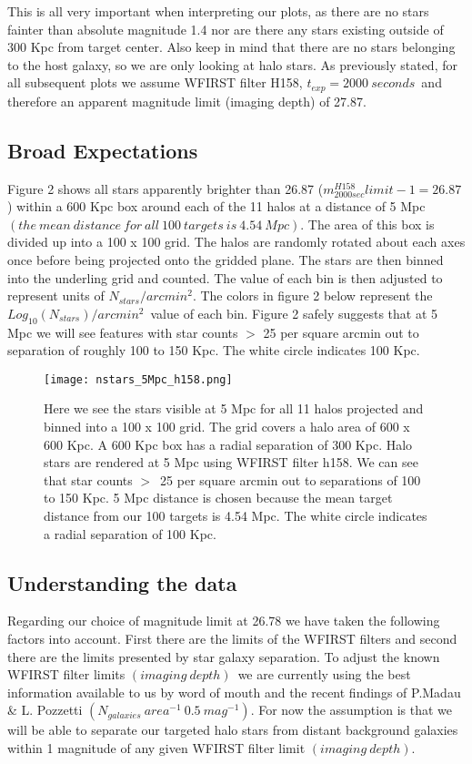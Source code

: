 \documentclass[11pt,a4paper,fleqn,notitlepage,oneside]{article}
\begin{document}
	This is all very important when interpreting our plots, as there are no stars fainter than absolute magnitude 1.4 nor are there any stars existing outside of 300 Kpc from target center.
	Also keep in mind that there are no stars belonging to the host galaxy, so we are only looking at halo stars.
	As previously stated, for all subsequent plots we assume WFIRST filter H158, $t_{exp}=2000\ seconds$\ and therefore an apparent magnitude limit (imaging depth) of 27.87.

	\subsection{Broad Expectations} %
		\label{sub:broad_expectations}
		Figure 2 shows all stars apparently brighter than 26.87 ($m^{H158}_{2000sec}limit-1=26.87$) within a 600 Kpc box around each of the 11 halos at a distance of 5 Mpc $(the \ mean\ distance\ for\ all\ 100\ targets\ is\ 4.54\ Mpc)$.
		The area of this box is divided up into a 100 x 100 grid.
		The halos are randomly rotated about each axes once before being projected onto the gridded plane.
		The stars are then binned into the underling grid and counted.
		The value of each bin is then adjusted to represent units of $N_{stars}/arcmin^{2}$.
		The colors in figure 2 below represent the $Log_{10}(N_{stars})/arcmin^{2}$\ value of each bin.
		Figure 2 safely suggests that at 5 Mpc we will see features with star counts $>$ 25 per square arcmin out to separation of roughly 100 to 150 Kpc.
		The white circle indicates 100 Kpc.
		\begin{figure}[H]
			\texttt{[image: nstars\_5Mpc\_h158.png]}
		\caption{
			Here we see the stars visible at 5 Mpc for all 11 halos projected and binned into a 100 x 100 grid.
			The grid covers a halo area of 600 x 600 Kpc.
			A 600 Kpc box has a radial separation of 300 Kpc.
			Halo stars are rendered at 5 Mpc using WFIRST filter h158.
			We can see that star counts $>$\ 25 per square arcmin out to separations of 100 to 150 Kpc.
			5 Mpc distance is chosen because the mean target distance from our 100 targets is 4.54 Mpc.
			The white circle indicates a radial separation of 100 Kpc.
		}
		\label{fig:log Nstars per sqdeg}
		\end{figure}

	\subsection{Understanding the data} %
		\label{sub:understanding_the_data}
		Regarding our choice of magnitude limit at 26.78 we have taken the following factors into account.
		First there are the limits of the WFIRST filters and second there are the limits presented by star galaxy separation. 
		To adjust the known WFIRST filter limits $(imaging\ depth)$\ we are currently using the best information available to us by word of mouth and the recent findings of P.Madau \& L. Pozzetti $(N_{galaxies}\ area^{-1}\ 0.5\ mag^{-1})$.
		For now the assumption is that we will be able to separate our targeted halo stars from distant background galaxies within 1 magnitude of any given WFIRST filter limit $(imaging\ depth)$.
\end{document}
